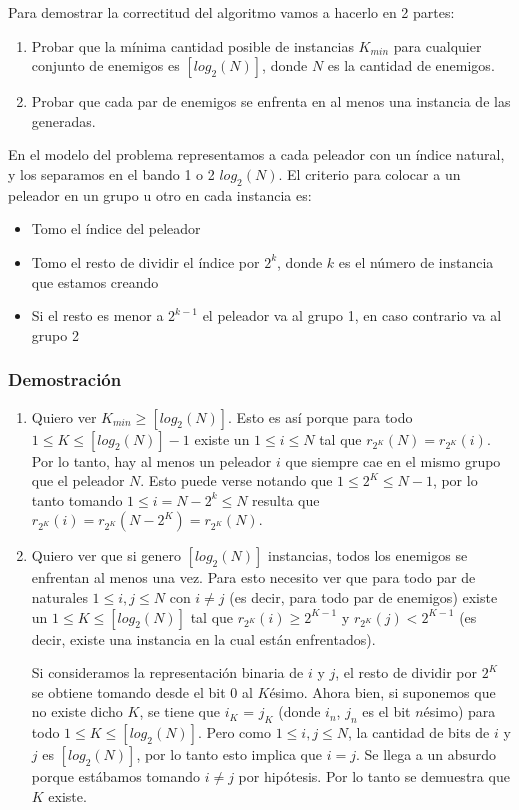 Para demostrar la correctitud del algoritmo vamos a hacerlo en 2 partes:
\begin{enumerate}
\item Probar que la mínima cantidad posible de instancias $K_{min}$ para cualquier conjunto de enemigos es $[log_2(N)]$, donde $N$ es la cantidad de enemigos. 
\item Probar que cada par de enemigos se enfrenta en al menos una instancia de las generadas.
\end{enumerate}

En el modelo del problema representamos a cada peleador con un índice natural, y los separamos en el bando 1 o 2 $log_2(N)$.
El criterio para colocar a un peleador en un grupo u otro en cada instancia es:
\begin{itemize}
\item Tomo el índice del peleador
\item Tomo el resto de dividir el índice por $2^k$, donde $k$ es el número de instancia que estamos creando
\item Si el resto es menor a $2^{k-1}$ el peleador va al grupo 1, en caso contrario va al grupo 2
\end{itemize}

\subsubsection{Demostración}
\begin{enumerate}
\item Quiero ver $K_{min} \geq [log_2(N)]$. Esto es así porque para todo $1 \leq K \leq [log_2(N)] - 1$ existe un $1 \leq i \leq N$ tal que $r_{2^K}(N) = r_{2^K}(i)$. Por lo tanto, hay al menos un peleador $i$ que siempre cae en el mismo grupo que el peleador $N$. Esto puede verse notando que $1 \leq 2^K \leq N - 1$, por lo tanto tomando $1 \leq i = N-2^k \leq N$ resulta que $r_{2^K}(i) = r_{2^K}(N-2^K) = r_{2^K}(N)$.

\item Quiero ver que si genero $[log_2(N)]$ instancias, todos los enemigos se enfrentan al menos una vez. Para esto necesito ver que para todo par de naturales $1 \leq i, j \leq N$ con $i \neq j$ (es decir, para todo par de enemigos) existe un $1 \leq K \leq [log_2(N)]$ tal que $r_{2^K}(i) \geq 2^{K-1}$ y $r_{2^K}(j) < 2^{K-1}$ (es decir, existe una instancia en la cual están enfrentados). 

Si consideramos la representación binaria de $i$ y $j$, el resto de dividir por $2^K$ se obtiene tomando desde el bit 0 al $K$ésimo. Ahora bien, si suponemos que no existe dicho $K$, se tiene que $i_K$ = $j_K$ (donde $i_n$, $j_n$ es el bit $n$ésimo) para todo $1 \leq K \leq [log_2(N)]$. Pero como $1 \leq i, j \leq N$, la cantidad de bits de $i$ y $j$ es $[log_2(N)]$, por lo tanto esto implica que $i = j$. Se llega a un absurdo porque estábamos tomando $i \neq j$ por hipótesis. Por lo tanto se demuestra que $K$ existe.
\end{enumerate}

